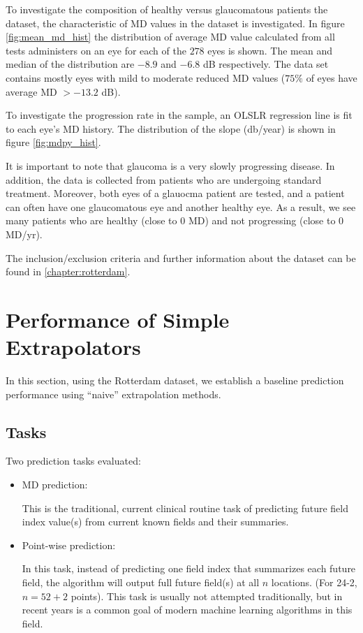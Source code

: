 To investigate the composition of healthy versus glaucomatous patients the dataset, the characteristic of MD values in the dataset is investigated. In figure \ref{fig:mean_md_hist} the distribution of average MD value calculated from all tests administers on an eye for each of the $278$ eyes is shown. The mean and median of the distribution are $-8.9$ and $-6.8$ dB respectively. The data set contains mostly eyes with mild to moderate reduced MD values ($75\%$ of eyes have average MD $>-13.2$ dB).

To investigate the progression rate in the sample, an \ac{OLSLR} regression line is fit to each eye's MD history. The distribution of the slope (db/year) is shown in figure \ref{fig:mdpy_hist}. 

It is important to note that glaucoma is a very slowly progressing disease. In addition, the data is collected from patients who are undergoing standard treatment. Moreover, both eyes of a glauocma patient are tested, and a patient can often have one glaucomatous eye and another healthy eye. As a result, we see many patients who are healthy (close to $0$ MD) and not progressing (close to $0$ MD/yr).

The inclusion/exclusion criteria and further information about the dataset can be found in \cref{chapter:rotterdam}.

\section{Performance of Simple Extrapolators}

In this section, using the Rotterdam dataset, we establish a baseline prediction performance using ``naive'' extrapolation methods. 

\subsection{Tasks}

Two prediction tasks evaluated:

\begin{itemize}
	\item \ac{MD} prediction:
	
	This is the traditional, current clinical routine task of predicting future field index value(s) from current known fields and their summaries. 
	
	\item Point-wise prediction:
	
	In this task, instead of predicting one field index that summarizes each future field, the algorithm will output full future field(s) at all $n$ locations. (For 24-2, $n=52+2$ points). This task is usually not attempted traditionally, but in recent years is a common goal of modern machine learning algorithms in this field.
	
\end{itemize}

